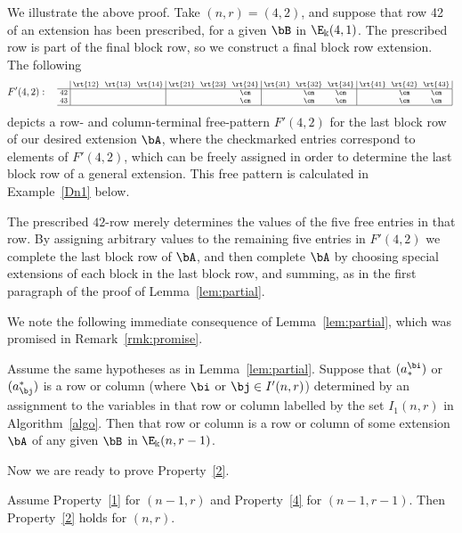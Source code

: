 \goodbreak
\begin{exam}
We illustrate the above proof. Take $(n,r)=(4,2)$, and suppose that
row 42 of an extension has been prescribed, for a given $\bB$ in
$\E_\Bbbk(4,1)$. The prescribed row is part of the final block row, so
we construct a final block row extension. The following
\[
F'(4,2): \quad
\text{\setlength{\arraycolsep}{2.7pt}\scriptsize
$\displaystyle \begin{array}{c|ccc|ccc|ccc|ccc|}
 &\rt{12}&\rt{13}&\rt{14}&\rt{21} &\rt{23}&\rt{24}&\rt{31}&\rt{32}
 &\rt{34}&\rt{41}&\rt{42}&\rt{43} \\ \hline 
 42 &&&		&&&\cm		&&\cm&\cm	&&\cm&\cm\\ 
 43 &&&		&&&\cm		&&\cm&\cm	&&\cm&\cm\\ 
 \hline
\end{array}\; $}
\]
depicts a row- and column-terminal free-pattern $F'(4,2)$ for the last
block row of our desired extension $\bA$, where the checkmarked entries
correspond to elements of $F'(4,2)$, which can be freely assigned in
order to determine the last block row of a general extension. This
free pattern is calculated in Example~\ref{Dn1} below.

The prescribed $42$-row merely determines the values of the five free
entries in that row. By assigning arbitrary values to the remaining
five entries in $F'(4,2)$ we complete the last block row of $\bA$, and
then complete $\bA$ by choosing special extensions of each block in
the last block row, and summing, as in the first paragraph of the
proof of Lemma~\ref{lem:partial}.
\end{exam}


We note the following immediate consequence of Lemma~\ref{lem:partial}, which was promised in Remark~\ref{rmk:promise}.

\begin{coro}\label{cor:colouring}
Assume the same hypotheses as in Lemma~\ref{lem:partial}. Suppose that
$(a^\bi_*)$ or $(a^*_\bj)$ is a row or column \textup{(}where $\bi$ or
$\bj \in I'(n,r)$\textup{)} determined by an assignment to the
variables in that row or column labelled by the set $I_1(n,r)$ in
Algorithm~\ref{algo}. Then that row or column is a row or column of
some extension $\bA$ of any given $\bB$ in $\E_\Bbbk(n,r-1)$.
\end{coro}

Now we are ready to prove Property~\ref{2}. 

\begin{prop}\label{prop:decomp}
Assume Property~\ref{1} for $(n-1,r)$ and Property~\ref{4} for
$(n-1,r-1)$. Then Property~\ref{2} holds for $(n,r)$.
\end{prop}


